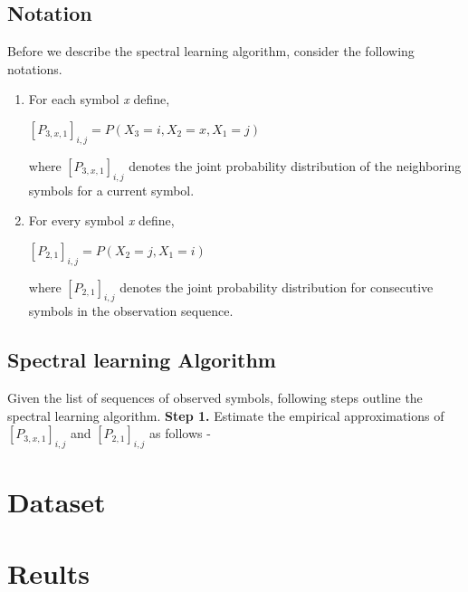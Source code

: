 \documentclass{article} %
\begin{document}
\subsection{Notation}
Before we describe the spectral learning algorithm, consider the following notations.
\begin{enumerate}
\item For each symbol \textit{x} define, 
\begin{center}
$[P_{3,x,1}]_{i,j} = P(X_3 = i, X_2 = x, X_1 = j)$
\end{center}
where $[P_{3,x,1}]_{i,j}$ denotes the joint probability distribution of the neighboring symbols for a current symbol.
\item For every symbol \textit{x} define,
\begin{center}
$[P_{2,1}]_{i,j} = P(X_2 = j, X_1 = i)$
\end{center}
where $[P_{2,1}]_{i,j}$ denotes the joint probability distribution for consecutive symbols in the observation sequence.
\end{enumerate}
\subsection{Spectral learning Algorithm}
Given the list of sequences of observed symbols, following steps outline the spectral learning algorithm.
\newline
\newline
\textbf{Step 1.} Estimate the empirical approximations of $[P_{3,x,1}]_{i,j}$ and $[P_{2,1}]_{i,j}$ as follows - 
\section{Dataset}

\section{Reults}
\end{document}
